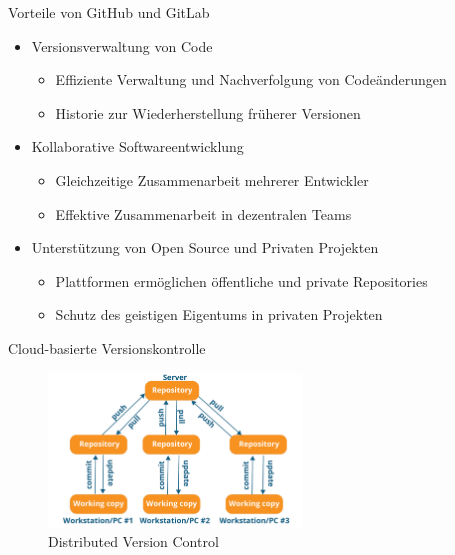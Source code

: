 \documentclass[compress,aspectratio=169]{beamer}
\begin{document}
	\begin{frame}{Vorteile von GitHub und GitLab}
		\begin{itemize}
			\item Versionsverwaltung von Code
			\begin{itemize}
				\item Effiziente Verwaltung und Nachverfolgung von Codeänderungen
				\item Historie zur Wiederherstellung früherer Versionen
			\end{itemize}
			\item Kollaborative Softwareentwicklung
			\begin{itemize}
				\item Gleichzeitige Zusammenarbeit mehrerer Entwickler
				\item Effektive Zusammenarbeit in dezentralen Teams
			\end{itemize}
			\item Unterstützung von Open Source und Privaten Projekten
			\begin{itemize}
				\item Plattformen ermöglichen öffentliche und private Repositories
				\item Schutz des geistigen Eigentums in privaten Projekten
			\end{itemize}
		\end{itemize}
	\end{frame}

	\begin{frame}{Cloud-basierte Versionskontrolle}
		\begin{figure}
			\includegraphics[width=0.6\textwidth]{assets/version-control.png}
			\caption{Distributed Version Control}
		\end{figure}
	\end{frame}
	
\end{document}
